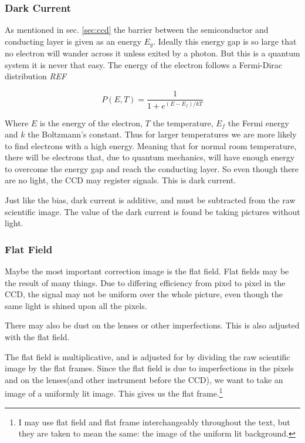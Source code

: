 \documentclass{emulateapj}
\begin{document}
\subsubsection{Dark Current}
As mentioned in sec. \ref{sec:ccd} the barrier between the semiconductor and conducting layer is given as an energy $E_g$. Ideally this energy gap is so large that no electron will wander across it unless exited by a photon. But this is a quantum system it is never that easy. The energy of the electron follows a Fermi-Dirac distribution \emph{REF}

\begin{equation}
P(E,T) = \frac{1}{1 + e^{(E-E_f)/kT}}
\end{equation}

Where $E$ is the energy of the electron, $T$ the temperature, $E_f$ the Fermi energy and $k$ the Boltzmann's constant. Thus for larger temperatures we are more likely to find electrons with a high energy. Meaning that for normal room temperature, there will be electrons that, due to quantum mechanics, will have enough energy to overcome the energy gap and reach the conducting layer. So even though there are no light, the CCD may register signals. This is dark current.

Just like the bias, dark current is additive, and must be subtracted from the raw scientific image. The value of the dark current is found be taking pictures without light.

\subsubsection{Flat Field}
Maybe the most important correction image is the flat field. Flat fields may be the result of many things. Due to differing efficiency from pixel to pixel in the CCD, the signal may not be uniform over the whole picture, even though the same light is shined upon all the pixels. 

There may also be dust on the lenses or other imperfections. This is also adjusted with the flat field.

The flat field is multiplicative, and is adjusted for by dividing the raw scientific image by the flat frames. Since the flat field is due to imperfections in the pixels and on the lenses(and other instrument before the CCD), we want to take an image of a uniformly lit image. This gives us the flat frame.\footnote{I may use flat field and flat frame interchangeably throughout the text, but they are taken to mean the same: the image of the uniform lit background.}
\end{document}
